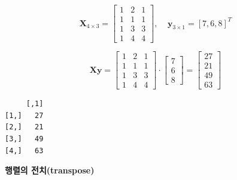 \documentclass[
  11pt,
]{krantz}
\newenvironment{Shaded}{\begin{snugshade}}{\end{snugshade}}
\newcommand{\DataTypeTok}[1]{\textcolor[rgb]{0.27,0.27,0.27}{#1}}
\newcommand{\DecValTok}[1]{\textcolor[rgb]{0.06,0.06,0.06}{#1}}
\newcommand{\KeywordTok}[1]{\textcolor[rgb]{0.27,0.27,0.27}{\textbf{#1}}}
\newcommand{\NormalTok}[1]{#1}
\newcommand{\OperatorTok}[1]{\textcolor[rgb]{0.43,0.43,0.43}{\textbf{#1}}}
\newcommand{\StringTok}[1]{\textcolor[rgb]{0.5,0.5,0.5}{#1}}
\begin{document}
\[\mathrm{\mathbf{X}}_{4\times 3} = 
\begin{bmatrix}
1 & 2 & 1 \\
1 & 1 & 1 \\
1 & 3 & 3 \\
1 & 4 & 4 
\end{bmatrix}, ~~~~~
\mathrm{\mathbf y}_{3\times 1} = [7, 6, 8]^T
\]

\[\mathrm{\mathbf{X}}\mathrm{\mathbf{y}} = 
\begin{bmatrix}
1 & 2 & 1 \\
1 & 1 & 1 \\
1 & 3 & 3 \\
1 & 4 & 4 
\end{bmatrix} \cdot 
\begin{bmatrix}
7 \\
6 \\
8
\end{bmatrix} = 
\begin{bmatrix}
27 \\
21 \\
49 \\
63
\end{bmatrix}
\]

\footnotesize

\begin{Shaded}
\end{Shaded}

\begin{verbatim}
     [,1]
[1,]   27
[2,]   21
[3,]   49
[4,]   63
\end{verbatim}

\normalsize

\textbf{행렬의 전치(transpose)}
\end{document}
